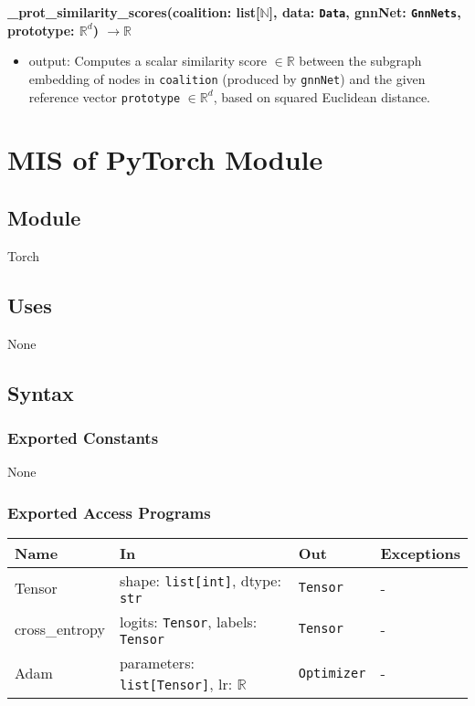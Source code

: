 \documentclass[12pt, titlepage]{article}
\begin{document}
\noindent \textbf{\_prot\_similarity\_scores(coalition: list[\(\mathbb{N}\)], data: \texttt{Data}, gnnNet: \texttt{GnnNets}, prototype: \(\mathbb{R}^d\)) \(\rightarrow \mathbb{R}\)}
\begin{itemize}
  \item output: Computes a scalar similarity score \(\in \mathbb{R}\) between the subgraph embedding of nodes in \texttt{coalition} (produced by \texttt{gnnNet}) and the given reference vector \texttt{prototype} \(\in \mathbb{R}^d\), based on squared Euclidean distance.
\end{itemize}



\newpage



\section{MIS of PyTorch Module} \label{TorchModule}

\subsection{Module}
Torch

\subsection{Uses}
None

\subsection{Syntax}

\subsubsection{Exported Constants}
None

\subsubsection{Exported Access Programs}

\begin{center}
\begin{tabular}{p{3.2cm} p{5.5cm} p{4cm} p{2.5cm}}
\hline
\textbf{Name} & \textbf{In} & \textbf{Out} & \textbf{Exceptions} \\
\hline
Tensor & shape: \texttt{list[int]}, dtype: \texttt{str} & \texttt{Tensor} & - \\
cross\_entropy & logits: \texttt{Tensor}, labels: \texttt{Tensor} & \texttt{Tensor} & - \\
Adam & parameters: \texttt{list[Tensor]}, lr: \(\mathbb{R}\) & \texttt{Optimizer} & - \\
\hline
\end{tabular}
\end{center}
\end{document}
